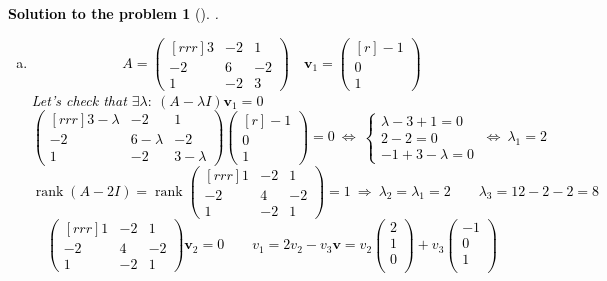 \documentclass[12pt,a4]{article}
\newtheorem{solution}{Solution to the problem}
\newcommand\rank{\operatorname{rank}}
\newcommand{\bv}{{\mathbf v}}
\begin{document}
\textcolor{black}{
\begin{solution}[]\rm .
\begin{enumerate}[(a)]
	\item
\[
A = 
\begin{pmatrix}[rrr]
3 &-2 & 1 \\ 
-2 & 6 & -2 \\
1 & -2 & 3
\end{pmatrix}
\quad
\bv_1 = 
\begin{pmatrix}[r]
-1 \\ 0 \\ 1
\end{pmatrix}
\]
Let's check that $\exists \lambda: ~ (A - \lambda I)\bv_1 = 0$
\[
\begin{pmatrix}[rrr]
3-\lambda &-2 & 1 \\ 
-2 & 6-\lambda & -2 \\
1 & -2 & 3-\lambda
\end{pmatrix}
\begin{pmatrix}[r]
-1 \\ 0 \\ 1
\end{pmatrix}
=0
~\Leftrightarrow~
\left \{ \begin{matrix}
\lambda - 3 + 1 = 0\\ 
2 -2 = 0 \\
-1 + 3-\lambda = 0
\end{matrix} \right .
~\Leftrightarrow~
\lambda_1 = 2
\]
\[
\rank(A - 2I) =
\rank
\begin{pmatrix}[rrr]
1 &-2 & 1 \\ 
-2 & 4 & -2 \\
1 & -2 & 1
\end{pmatrix}
 = 1
 ~ \Rightarrow ~
 \lambda_2 = \lambda_1 = 2
\qquad
\lambda_3 = 12 - 2 - 2 = 8
\]
\[
\begin{pmatrix}[rrr]
1 &-2 & 1 \\ 
-2 & 4 & -2 \\
1 & -2 & 1
\end{pmatrix}
\bv_2 = 0
\qquad 
v_1 = 2v_2 - v_3
\bv = 
v_2
\begin{pmatrix}
2\\ 1 \\ 0 \\
\end{pmatrix}
+
v_3
\begin{pmatrix}
-1\\ 0 \\ 1 \\
\end{pmatrix}
\]
\end{enumerate}
\end{solution}}
\end{document}
